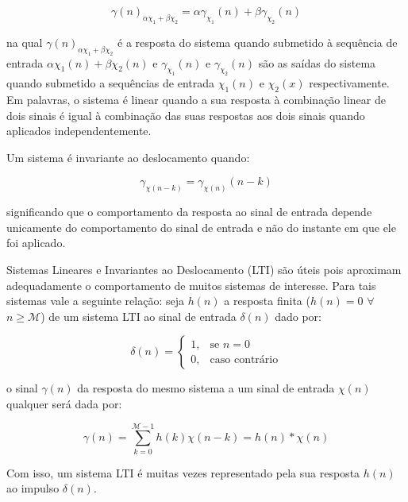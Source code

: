 {\begin{equation}
\gamma(n)_{\alpha \chi_1 + \beta \chi_2} = \alpha \gamma_{\chi_1}(n) + \beta \gamma_{\chi_2}(n)
\end{equation}

na qual $\gamma(n)_{\alpha \chi_1 + \beta \chi_2}$ é a resposta do sistema
quando submetido à sequência de entrada $\alpha \chi_1(n) + \beta \chi_2(n)$ e
$\gamma_{\chi_1}(n)$ e $\gamma_{\chi_2}(n)$ são as saídas do sistema quando
submetido a sequências de entrada $\chi_1(n)$ e $\chi_2(x)$ respectivamente. Em
palavras, o sistema é linear quando a sua resposta à combinação linear de dois
sinais é igual à combinação das suas respostas aos dois sinais quando aplicados
independentemente. 

Um sistema é invariante ao deslocamento quando:

\begin{equation}
\gamma_{\chi(n-k)} = \gamma_{\chi(n)}(n - k)
\end{equation}

significando que o comportamento da resposta ao sinal de entrada depende
unicamente do comportamento do sinal de entrada e não do instante em que ele foi
aplicado.

Sistemas Lineares e Invariantes ao Deslocamento (LTI) são úteis pois aproximam
adequadamente o comportamento de muitos sistemas de interesse. Para tais
sistemas vale a seguinte relação: seja $h(n)$ a resposta finita ($h(n) = 0$
$\forall$ $n \geq \mathcal{M}$) de um sistema  LTI ao sinal de entrada $\delta(n)$ dado por:

\begin{equation}
    \delta(n)= 
\begin{cases}
    1,& \text{se } n = 0\\
    0,              & \text{caso contrário}
\end{cases}
\end{equation}

o sinal $\gamma(n)$ da resposta do mesmo sistema a um sinal de entrada $\chi(n)$
qualquer será dada por:

\begin{equation}
\gamma(n) = \sum_{k=0} ^{\mathcal{M}-1} h(k)\chi(n-k) = h(n) * \chi(n)
\end{equation}

Com isso, um sistema LTI é muitas vezes representado pela sua resposta $h(n)$ ao
impulso $\delta(n)$.



}
